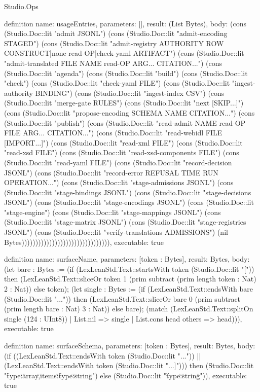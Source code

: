 \begin{lexlean}{Studio.Ops}
\begin{semanticmodule}
{definition{
  name: usageEntries,
  parameters: [],
  result: (List Bytes),
  body: (cons (Studio.Doc::lit "admit JSONL")
    (cons (Studio.Doc::lit "admit-encoding STAGED")
    (cons (Studio.Doc::lit "admit-registry AUTHORITY ROW CONSTRUCT|none read-OP|check-yaml ARTIFACT")
    (cons (Studio.Doc::lit "admit-translated FILE NAME read-OP ARG... CITATION...")
    (cons (Studio.Doc::lit "agenda")
    (cons (Studio.Doc::lit "build")
    (cons (Studio.Doc::lit "check")
    (cons (Studio.Doc::lit "check-yaml FILE")
    (cons (Studio.Doc::lit "ingest-authority BINDING")
    (cons (Studio.Doc::lit "ingest-index CSV")
    (cons (Studio.Doc::lit "merge-gate RULES")
    (cons (Studio.Doc::lit "next [SKIP...]")
    (cons (Studio.Doc::lit "propose-encoding SCHEMA NAME CITATION...")
    (cons (Studio.Doc::lit "publish")
    (cons (Studio.Doc::lit "read-admit NAME read-OP FILE ARG... CITATION...")
    (cons (Studio.Doc::lit "read-webidl FILE [IMPORT...]")
    (cons (Studio.Doc::lit "read-xml FILE")
    (cons (Studio.Doc::lit "read-xsd FILE")
    (cons (Studio.Doc::lit "read-xsd-components FILE")
    (cons (Studio.Doc::lit "read-yaml FILE")
    (cons (Studio.Doc::lit "record-decision JSONL")
    (cons (Studio.Doc::lit "record-error REFUSAL TIME RUN OPERATION...")
    (cons (Studio.Doc::lit "stage-admissions JSONL")
    (cons (Studio.Doc::lit "stage-bindings JSONL")
    (cons (Studio.Doc::lit "stage-decisions JSONL")
    (cons (Studio.Doc::lit "stage-encodings JSONL")
    (cons (Studio.Doc::lit "stage-engine")
    (cons (Studio.Doc::lit "stage-mappings JSONL")
    (cons (Studio.Doc::lit "stage-matrix JSONL")
    (cons (Studio.Doc::lit "stage-registries JSONL")
    (cons (Studio.Doc::lit "verify-translations ADMISSIONS")
    (nil Bytes)))))))))))))))))))))))))))))))),
  executable: true
}

definition{
  name: surfaceName,
  parameters: [token : Bytes],
  result: Bytes,
  body: (let bare : Bytes := (if (LexLeanStd.Text::startsWith token (Studio.Doc::lit "[")) then (LexLeanStd.Text::sliceOr token 1 (prim subtract (prim length token : Nat) 2 : Nat)) else token); (let single : Bytes := (if (LexLeanStd.Text::endsWith bare (Studio.Doc::lit "...")) then (LexLeanStd.Text::sliceOr bare 0 (prim subtract (prim length bare : Nat) 3 : Nat)) else bare); (match (LexLeanStd.Text::splitOn single (124 : UInt8))
    | List.nil => single
    | List.cons head others => head))),
  executable: true
}

definition{
  name: surfaceSchema,
  parameters: [token : Bytes],
  result: Bytes,
  body: (if ((LexLeanStd.Text::endsWith token (Studio.Doc::lit "...")) || (LexLeanStd.Text::endsWith token (Studio.Doc::lit "...]"))) then (Studio.Doc::lit "{\"type\":\"array\",\"items\":{\"type\":\"string\"}}") else (Studio.Doc::lit "{\"type\":\"string\"}")),
  executable: true
}

}
\end{semanticmodule}
\end{lexlean}
